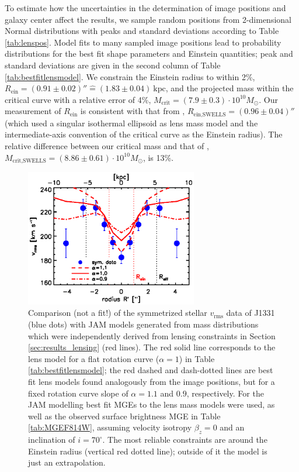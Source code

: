 \documentclass[useAMS,usenatbib]{mnras}
\begin{document}
To estimate how the uncertainties in the determination of image positions and galaxy center affect the results, we sample random positions from 2-dimensional Normal distributions with peaks and standard deviations according to Table \ref{tab:lenspos}. Model fits to many sampled image positions lead to probability distributions for the best fit shape parameters and Einstein quantities; peak and standard deviations are given in the second column of Table \ref{tab:bestfitlensmodel}. We constrain the Einstein radius to within 2\%, $R_\text{ein} = (0.91 \pm 0.02)'' \hat{=}(1.83\pm0.04)~\text{kpc}$, and the projected mass within the critical curve with a relative error of 4\%, $M_\text{crit} =(7.9\pm0.3)\cdot 10^{10} M_\odot$. Our measurement of $R_\text{ein}$ is consistent with that from \citet{SWELLSIII}, $R_\text{ein,SWELLS} = (0.96 \pm 0.04)''$ (which used a singular isothermal ellipsoid as lens mass model and the intermediate-axis convention of the critical curve as the Einstein radius). The relative difference between our critical mass and that of \citet{SWELLSIII}, $M_\text{crit,SWELLS} =(8.86\pm0.61)\cdot 10^{10} M_\odot$, is 13\%.

\begin{figure}
  \centering
  \includegraphics[height=6cm]{lensing_JAM_comparision.ps}
  \caption{Comparison (not a fit!) of the symmetrized stellar $v_\text{rms}$ data of J1331 (blue dots) with JAM models generated from mass distributions which were independently derived from lensing constraints in Section \ref{sec:results_lensing} (red lines). The red solid line corresponds to the lens model for a flat rotation curve ($\alpha = 1$) in Table \ref{tab:bestfitlensmodel}; the red dashed and dash-dotted lines are best fit lens models found analogously from the image positions, but for a fixed rotation curve slope of $\alpha = 1.1$ and $0.9$, respectively. For the JAM modelling best fit MGEs to the lens mass models were used, as well as the observed surface brightness MGE in Table \ref{tab:MGEF814W}, assuming velocity isotropy $\beta_z = 0$ and an inclination of $i = 70^\circ$. The most reliable constraints are around the Einstein radius (vertical red dotted line); outside of it the model is just an extrapolation.}
  \label{fig:JAM_modelL}
\end{figure}
\end{document}
